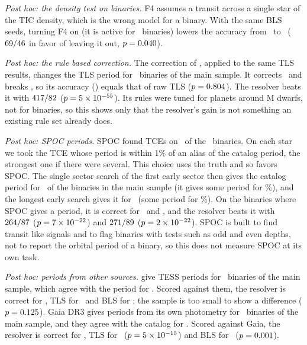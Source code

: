 \documentclass[twocolumn,linenumbers]{aastex701}
\begin{document}
\emph{Post hoc: the density test on binaries.} F4 assumes a transit across a single star of the TIC density, which is the wrong model for a binary. With the same BLS seeds, turning F4 on (it is active for \bFiveFourActive\ binaries) lowers the accuracy from \bFiveFourWithout\ to \bFiveFourWith\ ($69/46$ in favor of leaving it out, $p=0.040$).

\emph{Post hoc: the rule based correction.} The correction of \citet{Tschudi2026a}, applied to the same TLS results, changes the TLS period for \bFiveTschChanged\ binaries of the main sample. It corrects \bFiveTschToRight\ and breaks \bFiveTschToWrong, so its accuracy (\bFiveTschAcc) equals that of raw TLS ($p=0.804$). The resolver beats it with $417/82$ ($p=5\times10^{-55}$). Its rules were tuned for planets around M dwarfs, not for binaries, so this shows only that the resolver's gain is not something an existing rule set already does.

\emph{Post hoc: SPOC periods.} SPOC found TCEs on \bFiveSpocStars\ of the \bFiveIncluded\ binaries. On each star we took the TCE whose period is within 1\% of an alias of the catalog period, the strongest one if there were several. This choice uses the truth and so favors SPOC. The single sector search of the first early sector then gives the catalog period for \bFiveSpocOne\ of the binaries in the main sample (it gives some period for \bFiveSpocOneCov\%), and the longest early search gives it for \bFiveSpocE\ (some period for \bFiveSpocECov\%). On the binaries where SPOC gives a period, it is correct for \bFiveSpocOneGiven\ and \bFiveSpocEGiven, and the resolver beats it with $264/87$ ($p=7\times10^{-22}$) and $271/89$ ($p=2\times10^{-22}$). SPOC is built to find transit like signals and to flag binaries with tests such as odd and even depths, not to report the orbital period of a binary, so this does not measure SPOC at its own task.

\emph{Post hoc: periods from other sources.} \citet{Kostov2025} give TESS periods for \bFiveKostovN\ binaries of the main sample, which agree with the \citet{Prsa2022} period for \bFiveKostovCat. Scored against them, the resolver is correct for \bFiveKostovRes, TLS for \bFiveKostovTls\ and BLS for \bFiveKostovBls; the sample is too small to show a difference ($p=0.125$). Gaia DR3 gives periods from its own photometry \citep{GaiaDR3,Mowlavi2023} for \bFiveGaiaN\ binaries of the main sample, and they agree with the catalog for \bFiveGaiaCat. Scored against Gaia, the resolver is correct for \bFiveGaiaRes, TLS for \bFiveGaiaTls\ ($p=5\times10^{-15}$) and BLS for \bFiveGaiaBls\ ($p=0.001$).
\end{document}
